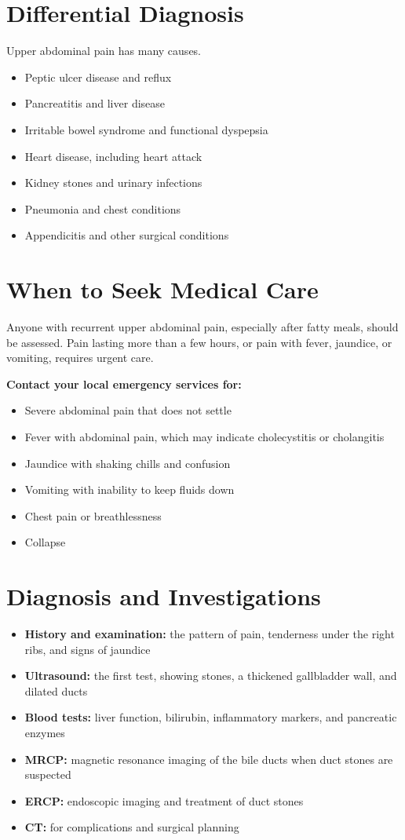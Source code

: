\section*{Differential Diagnosis}
Upper abdominal pain has many causes.
\begin{itemize}
    \item Peptic ulcer disease and reflux
    \item Pancreatitis and liver disease
    \item Irritable bowel syndrome and functional dyspepsia
    \item Heart disease, including heart attack
    \item Kidney stones and urinary infections
    \item Pneumonia and chest conditions
    \item Appendicitis and other surgical conditions
\end{itemize}

\section*{When to Seek Medical Care}
Anyone with recurrent upper abdominal pain, especially after fatty meals, should be assessed. Pain lasting more than a few hours, or pain with fever, jaundice, or vomiting, requires urgent care.

\textbf{Contact your local emergency services for:}
\begin{itemize}
    \item Severe abdominal pain that does not settle
    \item Fever with abdominal pain, which may indicate cholecystitis or cholangitis
    \item Jaundice with shaking chills and confusion
    \item Vomiting with inability to keep fluids down
    \item Chest pain or breathlessness
    \item Collapse
\end{itemize}

\section*{Diagnosis and Investigations}
\begin{itemize}
    \item \textbf{History and examination:} the pattern of pain, tenderness under the right ribs, and signs of jaundice
    \item \textbf{Ultrasound:} the first test, showing stones, a thickened gallbladder wall, and dilated ducts
    \item \textbf{Blood tests:} liver function, bilirubin, inflammatory markers, and pancreatic enzymes
    \item \textbf{MRCP:} magnetic resonance imaging of the bile ducts when duct stones are suspected
    \item \textbf{ERCP:} endoscopic imaging and treatment of duct stones
    \item \textbf{CT:} for complications and surgical planning
\end{itemize}

